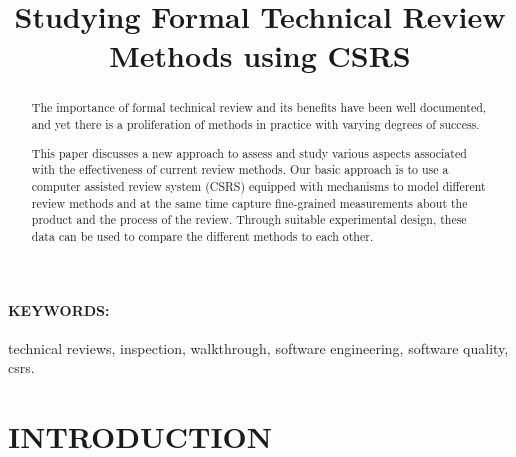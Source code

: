 
%





\title {Studying Formal Technical Review Methods using CSRS}

  

\maketitle


\begin{abstract}
The importance of formal technical review and its benefits have been
well documented, and yet there is a proliferation of methods in
practice with varying degrees of success.

This paper discusses a new approach to assess and study various
aspects associated with the effectiveness of current review methods.
Our basic approach is to use a computer assisted review system (CSRS)
equipped with mechanisms to model different review methods and 
at the same time capture fine-grained measurements
about the product and the process of the review.
Through suitable experimental design, these data can be used to
compare the different methods to each other.

\end{abstract}
\paragraph{KEYWORDS:}
technical reviews, inspection, walkthrough, software engineering, software
quality, csrs.

\section {INTRODUCTION}

